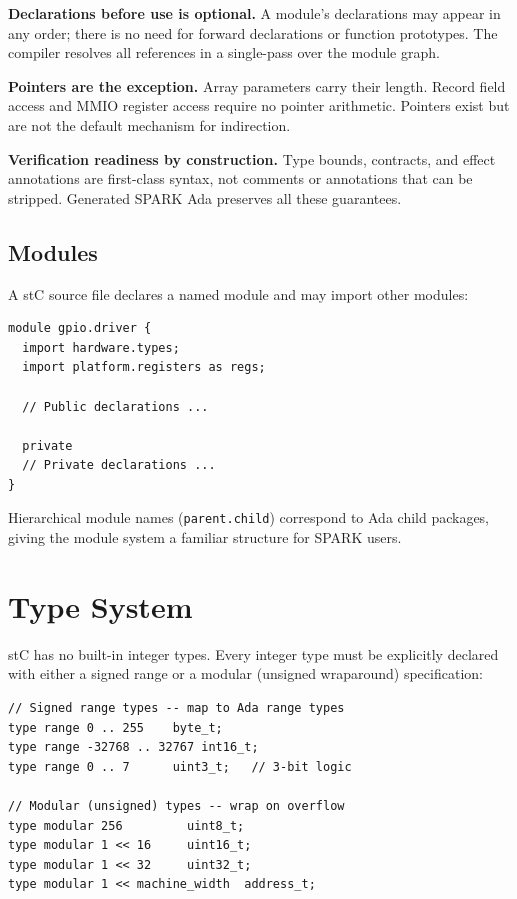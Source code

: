 \documentclass[runningheads]{llncs}
\begin{document}
\noindent\textbf{Declarations before use is optional.}
A module's declarations may appear in any order; there is no need for forward
declarations or function prototypes. The compiler resolves all references in a
single-pass over the module graph.

\noindent\textbf{Pointers are the exception.}
Array parameters carry their length. Record field access and MMIO register
access require no pointer arithmetic. Pointers exist but are not the default
mechanism for indirection.

\noindent\textbf{Verification readiness by construction.}
Type bounds, contracts, and effect annotations are first-class syntax, not
comments or annotations that can be stripped. Generated SPARK Ada preserves
all these guarantees.

\subsection{Modules}

A stC source file declares a named module and may import other modules:

\begin{lstlisting}[caption={Module structure}]
module gpio.driver {
  import hardware.types;
  import platform.registers as regs;

  // Public declarations ...

  private
  // Private declarations ...
}
\end{lstlisting}

Hierarchical module names (\texttt{parent.child}) correspond to Ada child
packages, giving the module system a familiar structure for SPARK users.

\section{Type System}
\label{sec:types}

stC has no built-in integer types. Every integer type must be explicitly declared
with either a signed range or a modular (unsigned wraparound) specification:

\begin{lstlisting}[caption={Scalar type declarations}]
// Signed range types -- map to Ada range types
type range 0 .. 255    byte_t;
type range -32768 .. 32767 int16_t;
type range 0 .. 7      uint3_t;   // 3-bit logic

// Modular (unsigned) types -- wrap on overflow
type modular 256         uint8_t;
type modular 1 << 16     uint16_t;
type modular 1 << 32     uint32_t;
type modular 1 << machine_width  address_t;
\end{lstlisting}
\end{document}
